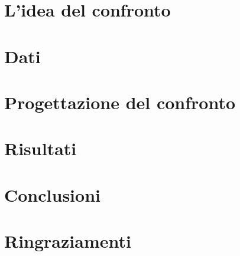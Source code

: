 \documentclass[a4paper,12pt]{report}
\begin{document}
\chapter{L'idea del confronto}


\chapter{Dati}


\chapter{Progettazione del confronto}


\chapter{Risultati}


\chapter{Conclusioni}


\chapter{Ringraziamenti}




\end{document}
